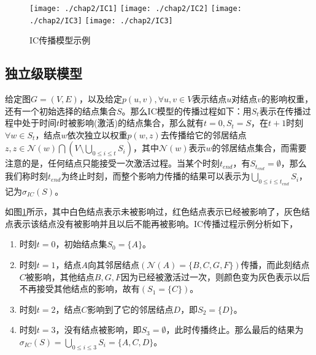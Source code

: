 \begin{figure}[H]
\centering%
	{\texttt{[image: ./chap2/IC1]}}
	\hspace{1mm}%
	{\texttt{[image: ./chap2/IC2]}}
	\hspace{1mm}%
	{\texttt{[image: ./chap2/IC3]}}
	\hspace{1mm}%
	{\texttt{[image: ./chap2/IC3]}}
	\caption{IC传播模型示例}
	\label{fig:IC-inf-diffusion}
\end{figure}


\subsection{独立级联模型}
\label{sec:IC-model-desc}
给定图$G=(V, E)$，以及给定$p(u, v), \forall u, v \in V$表示结点$u$对结点$v$的影响权重，还有一个初始选择的结点集合$S$。那么IC模型的传播过程如下：用$S_{t}$表示在传播过程中处于时间$t$时被影响(激活)的结点集合，那么就有$t=0, S_{t}=S$，在$t+1$时刻$\forall w \in S_{t}$，结点$w$依次独立以权重$p(w, z)$去传播给它的邻居结点$z, z \in \mathcal{N}(w) \bigcap (V \setminus \bigcup_{0 \leq i \leq t}S_{i})$，其中$\mathcal{N}(w)$表示$w$的邻居结点集合，而需要注意的是，任何结点只能接受一次激活过程。当某个时刻$t_{end}$，有$S_{t_{end}} = \emptyset$，那么我们称时刻$t_{end}$为终止时刻，而整个影响力传播的结果可以表示为$\bigcup_{0 \leq i \leq t_{end}}S_{i}$，记为$\sigma_{IC}(S)$。


如图\ref{fig:IC-inf-diffusion}所示，其中白色结点表示未被影响过，红色结点表示已经被影响了，灰色结点表示该结点没有被影响并且以后不能再被影响。IC传播过程示例分析如下，

\begin{enumerate}
\item 时刻$t=0$，初始结点集$S_{0}=\{A\}$。
\item 时刻$t=1$，结点$A$向其邻居结点$(\mathcal{N}(A)=\{B, C, G, F\})$传播，而此刻结点$C$被影响，其他结点$B, G, F$因为已经被激活过一次，则颜色变为灰色表示以后不再接受其他结点的影响，故有$(S_{1}=\{C\})$。
\item 时刻$t=2$，结点$C$影响到了它的邻居结点$D$，即$S_{2}=\{D\}$。
\item 时刻$t=3$，没有结点被影响，即$S_{3}=\emptyset$，此时传播终止。那么最后的结果为$\sigma_{IC}(S)=\bigcup_{0 \leq i \leq 3}S_{i}=\{A, C, D\}$。
\end{enumerate}


